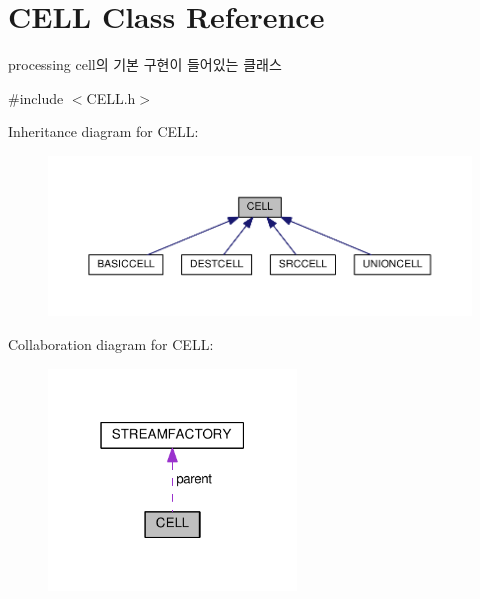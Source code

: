 \hypertarget{classCELL}{}\section{C\+E\+L\+L Class Reference}
\label{classCELL}


processing cell의 기본 구현이 들어있는 클래스  




{\ttfamily \#include $<$C\+E\+L\+L.\+h$>$}



Inheritance diagram for C\+E\+L\+L\+:\nopagebreak
\begin{figure}[H]
\begin{center}
\leavevmode
\includegraphics[width=350pt]{classCELL__inherit__graph}
\end{center}
\end{figure}


Collaboration diagram for C\+E\+L\+L\+:\nopagebreak
\begin{figure}[H]
\begin{center}
\leavevmode
\includegraphics[width=187pt]{classCELL__coll__graph}
\end{center}
\end{figure}
